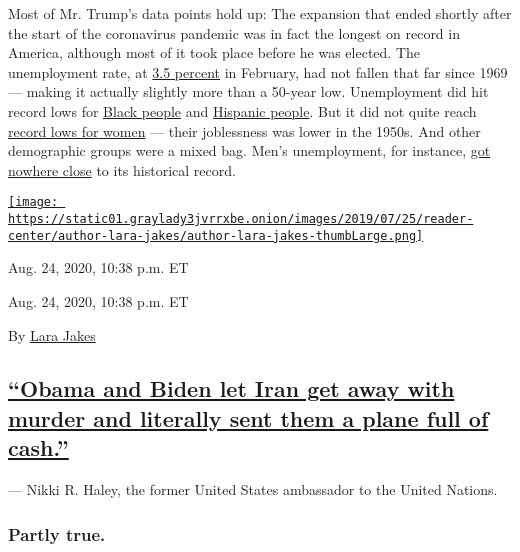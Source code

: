 Most of Mr. Trump's data points hold up: The expansion that ended
shortly after the start of the coronavirus pandemic was in fact the
longest on record in America, although most of it took place before he
was elected. The unemployment rate, at
\href{https://slack-redir.net/link?url=https\%3A\%2F\%2Ffred.stlouisfed.org\%2Fseries\%2FUNRATE}{3.5
percent} in February, had not fallen that far since 1969 --- making it
actually slightly more than a 50-year low. Unemployment did hit record
lows for
\href{https://slack-redir.net/link?url=https\%3A\%2F\%2Ffred.stlouisfed.org\%2Fseries\%2FLNS14000006}{Black
people} and
\href{https://slack-redir.net/link?url=https\%3A\%2F\%2Ffred.stlouisfed.org\%2Fseries\%2FLNS14000009}{Hispanic
people}. But it did not quite reach
\href{https://slack-redir.net/link?url=https\%3A\%2F\%2Ffred.stlouisfed.org\%2Fseries\%2FLNS14000002}{record
lows for women} --- their joblessness was lower in the 1950s. And other
demographic groups were a mixed bag. Men's unemployment, for instance,
\href{https://slack-redir.net/link?url=https\%3A\%2F\%2Ffred.stlouisfed.org\%2Fseries\%2FLNS14000001}{got
nowhere close} to its historical record.

\href{https://www.nytimes3xbfgragh.onion/by/lara-jakes}{\texttt{[image: https://static01.graylady3jvrrxbe.onion/images/2019/07/25/reader-center/author-lara-jakes/author-lara-jakes-thumbLarge.png]}}

Aug. 24, 2020, 10:38 p.m. ET

Aug. 24, 2020, 10:38 p.m. ET

By \href{https://www.nytimes3xbfgragh.onion/by/lara-jakes}{Lara Jakes}

\hypertarget{obama-and-biden-let-iran-get-away-with-murder-and-literally-sent-them-a-plane-full-of-cash}{%
\subsection{\texorpdfstring{\protect\hyperlink{obama-and-biden-let-iran-get-away-with-murder-and-literally-sent-them-a-plane-full-of-cash}{``Obama
and Biden let Iran get away with murder and literally sent them a plane
full of
cash.''}}{``Obama and Biden let Iran get away with murder and literally sent them a plane full of cash.''}}\label{obama-and-biden-let-iran-get-away-with-murder-and-literally-sent-them-a-plane-full-of-cash}}

--- Nikki R. Haley, the former United States ambassador to the United
Nations.

\hypertarget{partly-true}{%
\subsubsection{Partly true.}\label{partly-true}}

